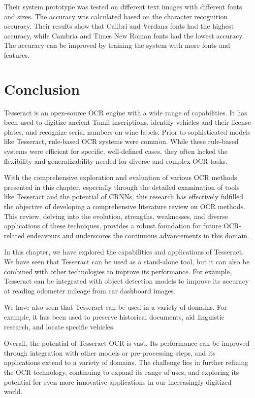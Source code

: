 Their system prototype was tested on different text images with different fonts and sizes. The accuracy was calculated based on the character recognition accuracy. Their results show that Calibri and Verdana fonts had the highest accuracy, while Cambria and Times New Roman fonts had the lowest accuracy.  The accuracy can be improved by training the system with more fonts and features. \cite{hossainOpticalCharacterRecognition2019}

\newpage
\section{Conclusion}

Tesseract is an open-source OCR engine with a wide range of capabilities. It has been used to digitize ancient Tamil inscriptions, identify vehicles and their license plates, and recognize serial numbers on wine labels. Prior to sophisticated models like Tesseract, rule-based OCR systems were common. While these rule-based systems were efficient for specific, well-defined cases, they often lacked the flexibility and generalizability needed for diverse and complex OCR tasks.

With the comprehensive exploration and evaluation of various OCR methods presented in this chapter, especially through the detailed examination of tools like Tesseract and the potential of CRNNs, this research has effectively fulfilled the objective of developing a comprehensive literature review on OCR methods. This review, delving into the evolution, strengths, weaknesses, and diverse applications of these techniques, provides a robust foundation for future OCR-related endeavours and underscores the continuous advancements in this domain.

In this chapter, we have explored the capabilities and applications of Tesseract. We have seen that Tesseract can be used as a stand-alone tool, but it can also be combined with other technologies to improve its performance. For example, Tesseract can be integrated with object detection models to improve its accuracy at reading odometer mileage from car dashboard images.

We have also seen that Tesseract can be used in a variety of domains. For example, it has been used to preserve historical documents, aid linguistic research, and locate specific vehicles.

Overall, the potential of Tesseract OCR is vast. Its performance can be improved through integration with other models or pre-processing steps, and its applications extend to a variety of domains. The challenge lies in further refining the OCR technology, continuing to expand its range of uses, and exploring its potential for even more innovative applications in our increasingly digitized world.

